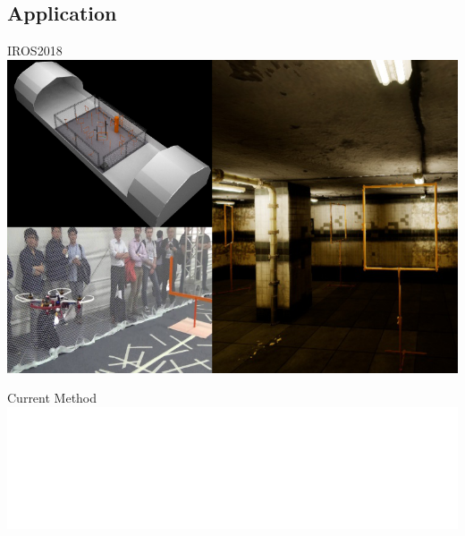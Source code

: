 \documentclass{beamer}
\begin{document}
\begin{darkframes}
	\subsection{Application}
    \begin{frame}{IROS2018}
    	\includegraphics[width=\textwidth]{fig/application}
    \end{frame}
    \begin{frame}{Current Method}
       	\includegraphics[width=\textwidth]{fig/current_method}
    \end{frame}

\end{darkframes}
\end{document}
